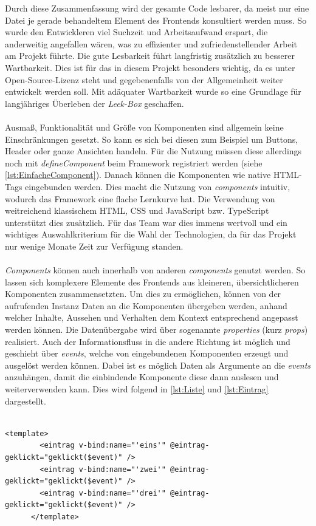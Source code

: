 \documentclass[10pt, a4paper]{article}
\begin{document}
\begin{onehalfspace}
  Durch diese Zusammenfassung wird der gesamte Code lesbarer,
  da meist nur eine Datei je gerade behandeltem Element des Frontends konsultiert werden muss.
  So wurde den Entwickleren viel Suchzeit und Arbeitsaufwand erspart, die anderweitig angefallen wären, was zu effizienter und zufriedenstellender Arbeit am Projekt führte.
  Die gute Lesbarkeit führt langfristig zusätzlich zu besserer Wartbarkeit. Dies ist für das in diesem Projekt besonders wichtig,
  da es unter Open-Source-Lizenz steht und gegebenenfalls von der Allgemeinheit weiter entwickelt werden soll.
  Mit adäquater Wartbarkeit wurde so eine Grundlage für langjähriges Überleben der \textit{Leek-Box} geschaffen.
  \\~\\
  Ausmaß, Funktionalität und Größe von Komponenten sind allgemein keine Einschränkungen gesetzt.
  So kann es sich bei diesen zum Beispiel um Buttons, Header oder ganze Ansichten handeln.
  Für die Nutzung müssen diese allerdings noch mit \textit{defineComponent} beim Framework registriert werden
  (siehe \autoref{lst:EinfacheComponent}).
  Danach können die Komponenten wie native HTML-Tags eingebunden werden.
  Dies macht die Nutzung von \textit{components} intuitiv, wodurch das Framework eine flache Lernkurve hat.
  Die Verwendung von weitreichend klassischem HTML, CSS und JavaScript bzw. TypeScript unterstützt dies zusätzlich.
  Für das Team war dies immens wertvoll und ein wichtiges Auswahlkriterium für die Wahl der Technologien,
  da für das Projekt nur wenige Monate Zeit zur Verfügung standen.
  \\~\\
  \textit{Components} können auch innerhalb von anderen \textit{components} genutzt werden.
  So lassen sich komplexere Elemente des Frontends aus kleineren, übersichtlicheren Komponenten zusammensetzten.
  Um dies zu ermöglichen, können von der aufrufenden Instanz Daten an die Komponenten übergeben werden,
    anhand welcher Inhalte, Aussehen und Verhalten dem Kontext entsprechend angepasst werden können.
  Die Datenübergabe wird über sogenannte \textit{properties} (kurz \textit{props}) realisiert.
  Auch der Informationsfluss in die andere Richtung ist möglich und geschieht über \textit{events}, welche von eingebundenen Komponenten erzeugt und ausgelöst werden können.
  Dabei ist es möglich Daten als Argumente an die \textit{events} anzuhängen, damit die einbindende Komponente diese dann auslesen und weiterverwenden kann.
  Dies wird folgend in \autoref{lst:Liste} und \autoref{lst:Eintrag} dargestellt.
  \\~\\
  \begin{minipage}{\textwidth}
    \begin{lstlisting}[caption={beispielhafte Listen-Komponente (Liste.vue)}, captionpos=b, label=lst:Liste]
      <template>
        <eintrag v-bind:name="'eins'" @eintrag-geklickt="geklickt($event)" />
        <eintrag v-bind:name="'zwei'" @eintrag-geklickt="geklickt($event)" />
        <eintrag v-bind:name="'drei'" @eintrag-geklickt="geklickt($event)" />
      </template>


\end{lstlisting}
\end{minipage}
\end{onehalfspace}
\end{document}
